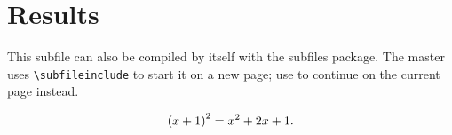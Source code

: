 \documentclass[main.tex]{subfiles}
\begin{document}
\section{Results}
\label{sec:results}
This subfile can also be compiled by itself with the subfiles package.
The master uses \verb|\subfileinclude| to start it on a new page;
use \verb|| to continue on the current page instead.

\begin{equation}
  \left(x+1\right)^2=x^2+2x+1.
\end{equation}
\end{document}
